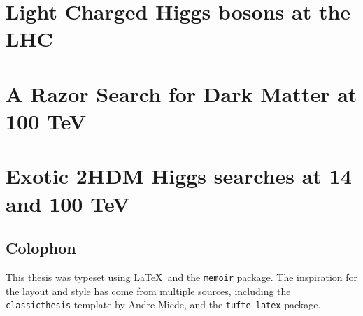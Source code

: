 \documentclass[final,oneside,10pt]{memoir}
\theoremstyle{definition}
\begin{document}




\tableofcontents*
\newpage
\listoffigures*
\newpage
\listoftables*
\newpage
{}





\chapter{Light Charged Higgs bosons at the LHC}
\chapter{A Razor Search for Dark Matter at 100 TeV}
\chapter{Exotic 2HDM Higgs searches at 14 and 100 TeV}
\appendix
\appendixpage


\printbibliography
\newpage
\pagestyle{empty}
\hfill
\vfill
\section*{Colophon}
This thesis was typeset using \LaTeX\ and the \texttt{memoir} package. The inspiration for the layout and style has come from multiple sources, including the \texttt{classicthesis} template by Andre Miede, and the \texttt{tufte-latex} package. 
\bigskip
\end{document}
